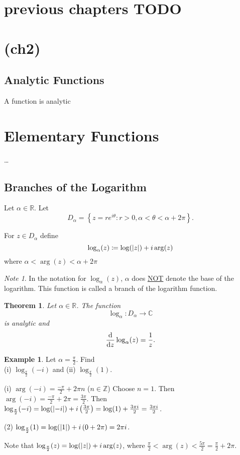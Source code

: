 \documentclass[11pt]{article}
\newcommand{\br}[1]{\left(#1\right)}
\newcommand{\cbr}[1]{\left\{#1\right\}}
\newtheorem{theorem}{Theorem}[section]
\theoremstyle{remark}
\newtheorem*{note}{Note}
\theoremstyle{definition}
\theoremstyle{remark}
\theoremstyle{definition}
\newtheorem*{example}{Example}
\theoremstyle{remark}
\begin{document}
\section{previous chapters TODO}

\newpage
\section{(ch2)}
\subsection{Analytic Functions}

A function is analytic

\section{Elementary Functions}
\dots

\subsection{Branches of the Logarithm}
Let $\alpha\in\mathbb{R}$. Let $$D_{\alpha} = \cbr{z = re^{i\theta} : r > 0, \alpha < \theta < \alpha + 2\pi}.$$


For $z\in D_{\alpha}$ define $$\log_{\alpha}(z) \coloneqq \log(\abs{z}) + i\arg(z) $$ where $\alpha < \arg(z) < \alpha + 2\pi$

\begin{note} In the notation for $\log_{\alpha}(z)$, $\alpha$ does \underline{NOT} denote the base of the logarithm. This function is called a branch of the logarithm function. \end{note}

\begin{theorem}
  Let $\alpha\in\mathbb{R}$. The function $$\log_{\alpha} : D_{\alpha}\to \mathbb{C}$$ is analytic and $$\dv{z}\log_{\alpha}(z) = \frac{1}{z}.$$
\end{theorem}

\begin{example}
  Let $\alpha = \frac{\pi}{2}$. Find \\
  (i) $\log_{\frac{\pi}{2}}(-i)$ and (ii) $\log_{\frac{\pi}{2}}(1)$.

  (i) $\arg(-i) = \frac{-\pi}{2} + 2\pi n$ ($n\in\mathbb{Z}$) Choose $n=1$. Then $\arg(-i) = \frac{-\pi}{2} + 2\pi = \frac{3\pi}{2}$. Then $\log_{\frac{\pi}{2}}(-i) = \log(\abs{-i}) + i\br{\frac{3\pi}{2}} = \log(1) + \frac{3\pi i}{2} = \frac{3\pi i}{2}$.

  (2) $\log_{\frac{\pi}{2}}(1) = \log(\abs{1}) + i\br{0+2\pi} = 2\pi i$.

  Note that $\log_{\frac{\pi}{2}}(z) = \log(\abs{z}) + i\arg(z)$, where $\frac{\pi}{2} < \arg(z) < \frac{5\pi}{2} = \frac{\pi}{2} + 2\pi$.
\end{example}
\end{document}
